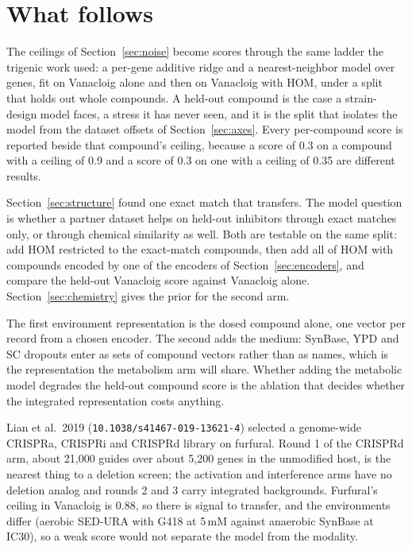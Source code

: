 
\section{What follows}
\label{sec:next}

The ceilings of Section~\ref{sec:noise} become scores through the same ladder the
trigenic work used: a per-gene additive ridge and a nearest-neighbor model over genes,
fit on Vanacloig alone and then on Vanacloig with HOM, under a split that holds out
whole compounds. A held-out compound is the case a strain-design model faces, a stress
it has never seen, and it is the split that isolates the model from the dataset
offsets of Section~\ref{sec:axes}. Every per-compound score is reported beside that
compound's ceiling, because a score of 0.3 on a compound with a ceiling of 0.9 and a
score of 0.3 on one with a ceiling of 0.35 are different results.

Section~\ref{sec:structure} found one exact match that transfers. The model question
is whether a partner dataset helps on held-out inhibitors through exact matches only,
or through chemical similarity as well. Both are testable on the same split: add HOM
restricted to the exact-match compounds, then add all of HOM with compounds encoded by
one of the encoders of Section~\ref{sec:encoders}, and compare the held-out Vanacloig
score against Vanacloig alone. Section~\ref{sec:chemistry} gives the prior for the
second arm.

The first environment representation is the dosed compound alone, one vector per record
from a chosen encoder. The second adds the medium: SynBase, YPD and SC dropouts enter as
sets of compound vectors rather than as names, which is the representation the
metabolism arm will share. Whether adding the metabolic model degrades the held-out
compound score is the ablation that decides whether the integrated representation
costs anything.

Lian et al.\ 2019 (\texttt{10.1038/s41467-019-13621-4}) selected a genome-wide
CRISPRa, CRISPRi and CRISPRd library on furfural. Round 1 of the CRISPRd arm, about
21{,}000 guides over about 5{,}200 genes in the unmodified host, is the nearest thing
to a deletion screen; the activation and interference arms have no deletion analog
and rounds 2 and 3 carry integrated backgrounds. Furfural's ceiling in Vanacloig is
0.88, so there is signal to transfer, and the environments differ (aerobic SED-URA
with G418 at 5\,mM against anaerobic SynBase at IC30), so a weak score would not
separate the model from the modality.

